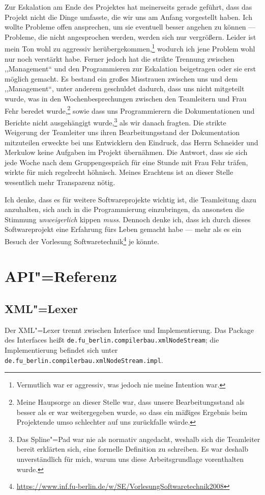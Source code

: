 \documentclass[10pt,a4paper,ngerman,titlepage,tocindentauto]{scrartcl}
\newcommand{\link}[1]{\href{#1}{#1}}
\newcommand{\fnlink}[1]{\footnote{\link{#1}}}
\newcommand{\n}{\linebreak[1]}
\begin{document}
		Zur Eskalation am Ende des Projektes hat meinerseits gerade geführt, dass das Projekt nicht die Dinge umfasste,
		die wir uns am Anfang vorgestellt haben. Ich wollte Probleme offen ansprechen, um sie eventuell besser angehen zu
		können --- Probleme, die nicht angesprochen werden, werden sich nur vergrößern. Leider ist mein Ton wohl zu aggressiv
		herübergekommen,\footnote{Vermutlich war er aggressiv, was jedoch nie meine Intention war.}
		wodurch ich jene Problem wohl nur noch verstärkt habe. Ferner jedoch hat die strikte Trennung zwischen
		,,Management`` und den Programmieren zur Eskalation beigetragen oder sie erst möglich gemacht. Es bestand ein großes
		Misstrauen zwischen uns und dem ,,Management``, unter anderem geschuldet dadurch, dass uns nicht mitgeteilt wurde,
		was in den Wochenbesprechungen zwischen den Teamleitern und Frau Fehr beredet wurde,\footnote{Meine Haupsorge an dieser
		Stelle war, dass unsere Bearbeitungsstand als besser als er war weitergegeben wurde, so dass ein mäßiges Ergebnis
		beim Projektende umso schlechter auf uns zurückfalle würde.} sowie dass uns Programmierern
		die Dokumentationen und Berichte nicht ausgehängigt wurde,\footnote{Das Spline"=Pad war nie als normativ angedacht,
		weshalb sich die Teamleiter bereit erklärten sich, eine formelle Definition zu schreiben. Es war deshalb unverständlich
		für mich, warum uns diese Arbeitsgrundlage vorenthalten wurde.} als wir danach fragten. Die strikte Weigerung der Teamleiter
		uns ihren Bearbeitungsstand der Dokumentation mitzuteilen erweckte bei uns Entwicklern den Eindruck, das Herrn Schneider und
		Merkulow keine Aufgaben im Projekt übernähmen. Die Antwort, dass sie sich jede Woche nach dem Gruppengespräch für eine
		Stunde mit Frau Fehr träfen, wirkte für mich regelrecht höhnisch. Meines Erachtens ist an dieser Stelle wesentlich
		mehr Transparenz nötig.
		
		Ich denke, dass es für weitere Softwareprojekte wichtig ist, die Teamleitung dazu anzuhalten, sich auch in die
		Programmierung einzubringen, da ansonsten die Stimmung {\em unweigerlich} kippen {\em muss}. Dennoch denke ich,
		dass ich durch dieses Softwareprojekt eine Erfahrung fürs Leben gemacht habe --- mehr als es ein Besuch der
		Vorlesung Softwaretechnik\fnlink{https://www.inf.fu-berlin.de/w/SE/VorlesungSoftwaretechnik2008} je könnte.
		
	\section{API"=Referenz}
		\subsection[XML-Lexer]{\hypertarget{XML-Lexer-API}{XML"=Lexer}}
			Der XML"=Lexer trennt zwischen Interface und Implementierung.
			Das Package des Interfaces heißt \texttt{de.{\n}fu\_berlin.{\n}compilerbau.{\n}xml\-Node\-Stream};
			die Implementierung befindet sich unter \texttt{de.{\n}fu\_berlin.{\n}compilerbau.{\n}xml\-Node\-Stream.{\n}impl}.
			
\end{document}
